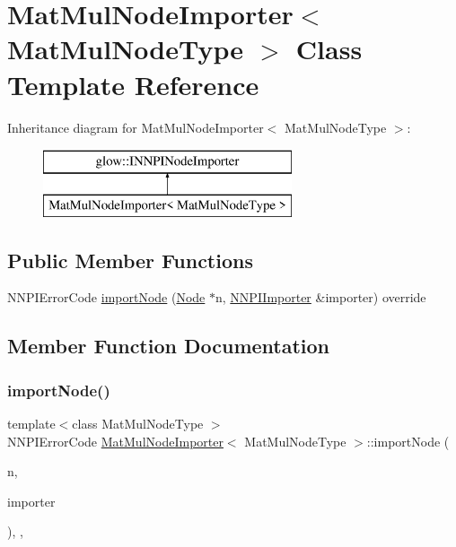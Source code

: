 \hypertarget{class_mat_mul_node_importer}{}\section{Mat\+Mul\+Node\+Importer$<$ Mat\+Mul\+Node\+Type $>$ Class Template Reference}
\label{class_mat_mul_node_importer}
Inheritance diagram for Mat\+Mul\+Node\+Importer$<$ Mat\+Mul\+Node\+Type $>$\+:\begin{figure}[H]
\begin{center}
\leavevmode
\includegraphics[height=2.000000cm]{class_mat_mul_node_importer}
\end{center}
\end{figure}
\subsection*{Public Member Functions}
\begin{DoxyCompactItemize}
\item 
N\+N\+P\+I\+Error\+Code \hyperlink{class_mat_mul_node_importer_aa242fb1f47df2fc688ff9c1e7cb79c0f}{import\+Node} (\hyperlink{classglow_1_1_node}{Node} $\ast$n, \hyperlink{classglow_1_1_n_n_p_i_importer}{N\+N\+P\+I\+Importer} \&importer) override
\end{DoxyCompactItemize}


\subsection{Member Function Documentation}
\mbox{\label{class_mat_mul_node_importer_aa242fb1f47df2fc688ff9c1e7cb79c0f}} 
\subsubsection{\texorpdfstring{import\+Node()}{importNode()}}
{\footnotesize\ttfamily template$<$class Mat\+Mul\+Node\+Type $>$ \\
N\+N\+P\+I\+Error\+Code \hyperlink{class_mat_mul_node_importer}{Mat\+Mul\+Node\+Importer}$<$ Mat\+Mul\+Node\+Type $>$\+::import\+Node (\begin{DoxyParamCaption}\item[{\hyperlink{classglow_1_1_node}{Node} $\ast$}]{n,  }\item[{\hyperlink{classglow_1_1_n_n_p_i_importer}{N\+N\+P\+I\+Importer} \&}]{importer }\end{DoxyParamCaption})\hspace{0.3cm}{\ttfamily [inline]}, {\ttfamily [override]}, {\ttfamily [virtual]}}

